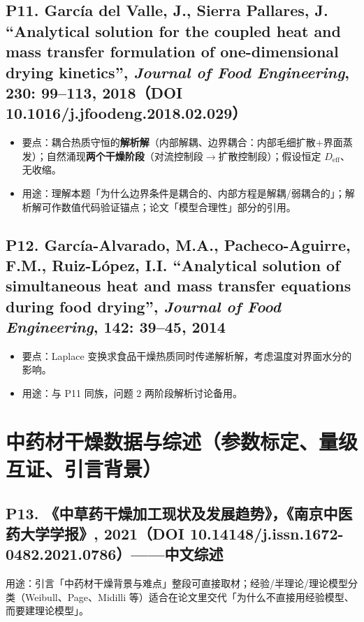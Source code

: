 \documentclass[12pt,a4paper]{ctexart}
\begin{document}
\subsection{P11. Garc\'ia del Valle, J., Sierra Pallares, J. ``Analytical solution for the coupled heat and mass transfer formulation of one-dimensional drying kinetics'', \textit{Journal of Food Engineering}, 230: 99--113, 2018（DOI 10.1016/j.jfoodeng.2018.02.029）\quad [摘要已核]}
\begin{itemize}
\item 要点：耦合热质守恒的\textbf{解析解}（内部解耦、边界耦合：内部毛细扩散$+$界面蒸发）；自然涌现\textbf{两个干燥阶段}（对流控制段$\to$扩散控制段）；假设恒定 $D_{\mathrm{eff}}$、无收缩。
\item 用途：理解本题「为什么边界条件是耦合的、内部方程是解耦/弱耦合的」；解析解可作数值代码验证锚点；论文「模型合理性」部分的引用。
\end{itemize}

\subsection{P12. Garc\'ia-Alvarado, M.A., Pacheco-Aguirre, F.M., Ruiz-L\'opez, I.I. ``Analytical solution of simultaneous heat and mass transfer equations during food drying'', \textit{Journal of Food Engineering}, 142: 39--45, 2014}
\begin{itemize}
\item 要点：Laplace 变换求食品干燥热质同时传递解析解，考虑温度对界面水分的影响。
\item 用途：与 P11 同族，问题 2 两阶段解析讨论备用。
\end{itemize}

\section{中药材干燥数据与综述（参数标定、量级互证、引言背景）}

\subsection{P13. 《中草药干燥加工现状及发展趋势》，《南京中医药大学学报》, 2021（DOI 10.14148/j.issn.1672-0482.2021.0786）——中文综述}
用途：引言「中药材干燥背景与难点」整段可直接取材；经验/半理论/理论模型分类（Weibull、Page、Midilli 等）适合在论文里交代「为什么不直接用经验模型、而要建理论模型」。
\end{document}
